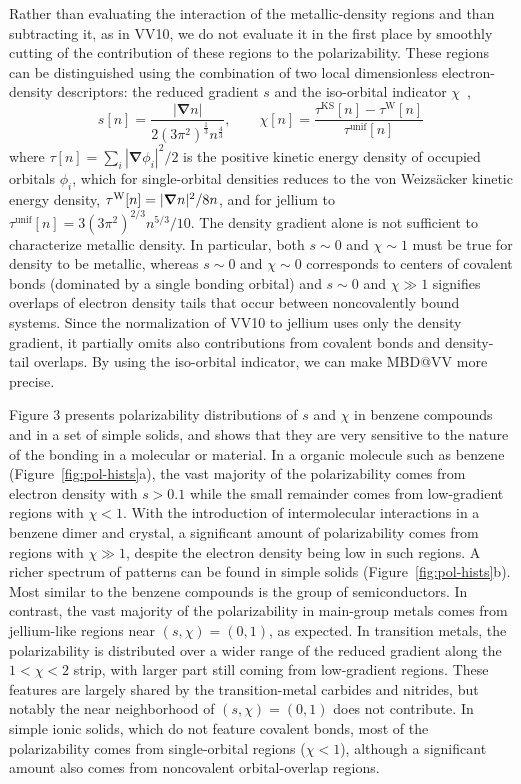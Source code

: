 Rather than evaluating the interaction of the metallic-density regions and than subtracting it, as in VV10, we do not evaluate it in the first place by smoothly cutting of the contribution of these regions to the polarizability.
These regions can be distinguished using the combination of two local dimensionless electron-density descriptors: the reduced gradient $s$ and the iso-orbital indicator $\chi$~\citep{BeckeJCP90,KummelMP03,SunPRL13},
\begin{equation}
  s[n]=\frac{|\boldsymbol\nabla n|}{2{(3\pi^2)}^\frac13n^\frac43},\qquad
  \chi[n]=\frac{\tau^\text{KS}[n]-\tau^\text{W}[n]}{\tau^\text{unif}[n]}
\end{equation}
where $\tau[n]=\sum_i|\boldsymbol\nabla\phi_i|^2/2$ is the positive kinetic energy density of occupied orbitals $\phi_i$, which for single-orbital densities reduces to the von Weizsäcker kinetic energy density, $\tau^\text W[n]=|\boldsymbol\nabla n|^2/8n$, and for jellium to $\tau^\mathrm{unif}[n]=3(3\pi^2)^{2/3}n^{5/3}/10$.  %
The density gradient alone is not sufficient to characterize metallic density.
In particular, both $s\sim0$ and $\chi\sim1$ must be true for density to be metallic, whereas $s\sim0$ and $\chi\sim0$ corresponds to centers of covalent bonds (dominated by a single bonding orbital) and $s\sim0$ and $\chi\gg1$ signifies overlaps of electron density tails that occur between noncovalently bound systems.
Since the normalization of VV10 to jellium uses only the density gradient, it partially omits also contributions from covalent bonds and density-tail overlaps.
By using the iso-orbital indicator, we can make MBD@VV more precise.

Figure 3 presents polarizability distributions of $s$ and $\chi$ in benzene compounds and in a set of simple solids, and shows that they are very sensitive to the nature of the bonding in a molecular or material.
In a organic molecule such as benzene (Figure~\ref{fig:pol-hists}a), the vast majority of the polarizability
comes from electron density with $s>0.1$ while the small remainder comes
from low-gradient regions with $\chi<1$.
With the introduction of intermolecular interactions in a benzene dimer and crystal, a significant amount of polarizability comes from regions with $\chi\gg1$, despite the electron density being low in such regions.
A richer spectrum of patterns can be found in simple solids (Figure~\ref{fig:pol-hists}b).
Most similar to the benzene compounds is the group of semiconductors.
In contrast, the vast majority of the polarizability in main-group metals comes from jellium-like regions near $(s,\chi)=(0,1)$, as expected.
In transition metals, the polarizability is distributed over a wider range of the reduced gradient along the $1<\chi<2$ strip, with larger part still coming from low-gradient regions.
These features are largely shared by the transition-metal carbides and nitrides, but notably the near neighborhood of $(s,\chi)=(0,1)$ does not contribute.
In simple ionic solids, which do not feature covalent bonds, most of the
polarizability comes from single-orbital regions ($\chi<1$), although a
significant amount also comes from noncovalent orbital-overlap regions.


